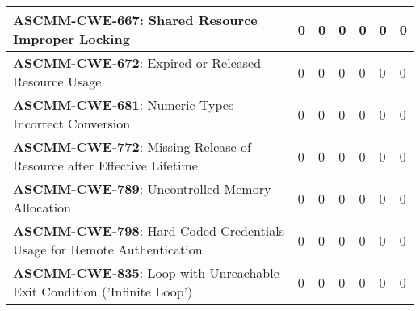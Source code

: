 \documentclass[openany,10pt,a4paper]{article}
\begin{document}
\begin{table}[h]
\begin{tabular}{|p{3in}|p{0.3in}|p{0.3in}|p{0.3in}|p{0.3in}|p{0.3in}|p{0.4in}|}
		\textbf{ASCMM-CWE-667}: Shared Resource Improper Locking & 0 & 0 & 0 & 0 & 0 & 0 \\ \hline
		\textbf{ASCMM-CWE-672}: Expired or Released Resource Usage & 0 & 0 & 0 & 0 & 0 & 0 \\ \hline
		\textbf{ASCMM-CWE-681}: Numeric Types Incorrect Conversion & 0 & 0 & 0 & 0 & 0 & 0 \\ \hline
		\textbf{ASCMM-CWE-772}: Missing Release of Resource after Effective Lifetime & 0 & 0 & 0 & 0 & 0 & 0 \\ \hline
		\textbf{ASCMM-CWE-789}: Uncontrolled Memory Allocation & 0 & 0 & 0 & 0 & 0 & 0 \\ \hline
		\textbf{ASCMM-CWE-798}: Hard-Coded Credentials Usage for Remote Authentication & 0 & 0 & 0 & 0 & 0 & 0 \\ \hline
		\textbf{ASCMM-CWE-835}: Loop with Unreachable Exit Condition ('Infinite Loop') & 0 & 0 & 0 & 0 & 0 & 0 \\ \hline
	\end{tabular} 
	\label{tab:tabela1}
\end{table}
\end{document}
